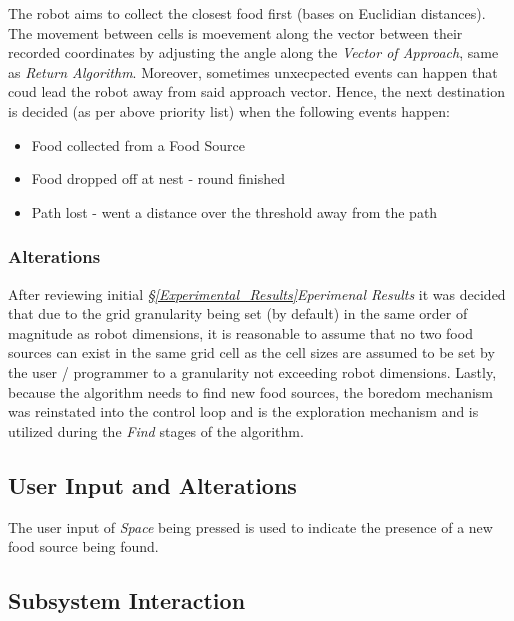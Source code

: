 \documentclass[11pt, a4paper]{article}
\begin{document}
The robot aims to collect the closest food first (bases on Euclidian distances). The movement between cells is moevement along the vector between their recorded coordinates by adjusting the angle along the \textit{Vector of Approach}, same as \textit{Return Algorithm}\cite{task2_report}. Moreover, sometimes unxecpected events can happen that coud lead the robot away from said approach vector. Hence, the next destination is decided (as per above priority list) when the following events happen:

\begin{itemize}

	\item Food collected from a Food Source
	\item Food dropped off at nest - round finished
	\item Path lost - went a distance over the threshold away from the path

\end{itemize}

\subsubsection{Alterations}
\label{Planner_Algorithm_Alterations}

After reviewing initial \textit{\S\ref{Experimental_Results}Eperimenal Results} it was decided that due to the grid granularity being set (by default) in the same order of magnitude as robot dimensions, it is reasonable to assume that no two food sources can exist in the same grid cell as the cell sizes are assumed to be set by the user / programmer to a granularity not exceeding robot dimensions. Lastly, because the algorithm needs to find new food sources, the boredom mechanism \cite{task1_report} was reinstated into the control loop and is the exploration mechanism and is utilized during the \textit{Find} stages of the algorithm. 



\subsection{User Input and Alterations}
\label{Planner_User_Input}

The user input of \textit{Space} being pressed is used to indicate the presence of a new food source being found. 

\subsection{Subsystem Interaction}
\end{document}

